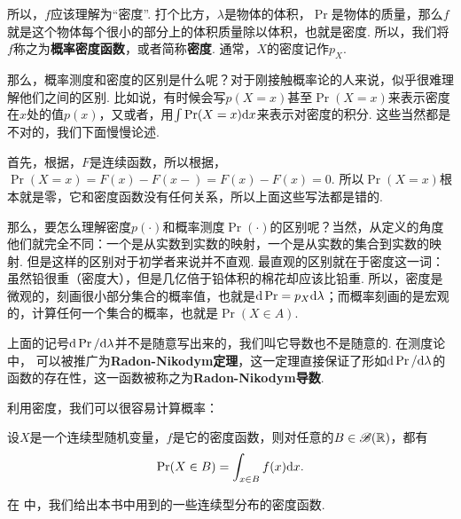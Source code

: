 所以，$f$应该理解为“密度”. 打个比方，$\lambda$是物体的体积，$\Pr$是物体的质量，那么$f$就是这个物体每个很小的部分上的体积质量除以体积，也就是密度. 所以，我们将$f$称之为\textbf{概率密度函数}，或者简称\textbf{密度}. 通常，$X$的密度记作$p_X$. 

那么，概率测度和密度的区别是什么呢？对于刚接触概率论的人来说，似乎很难理解他们之间的区别. 比如说，有时候会写$p(X=x)$甚至$\Pr(X=x)$来表示密度在$x$处的值$p(x)$，又或者，用$\int\Pr(X=x)\mathrm{d} x$来表示对密度的积分. 这些当然都是不对的，我们下面慢慢论述. 

首先，根据，$F$是连续函数，所以根据，$\Pr(X=x)=F(x)-F(x-)=F(x)-F(x)=0$. 所以$\Pr(X=x)$根本就是零，它和密度函数没有任何关系，所以上面这些写法都是错的. 

那么，要怎么理解密度$p(\cdot)$和概率测度$\Pr(\cdot)$的区别呢？当然，从定义的角度他们就完全不同：一个是从实数到实数的映射，一个是从实数的集合到实数的映射. 但是这样的区别对于初学者来说并不直观. 最直观的区别就在于密度这一词：虽然铅很重（密度大），但是几亿倍于铅体积的棉花却应该比铅重. 所以，密度是微观的，刻画很小部分集合的概率值，也就是$\mathrm{d}\Pr=p_X\mathrm{d} \lambda$；而概率刻画的是宏观的，计算任何一个集合的概率，也就是$\Pr(X\in A)$.

\begin{remark}
    上面的记号$\mathrm{d}\Pr/\mathrm{d}\lambda$并不是随意写出来的，我们叫它导数也不是随意的. 在测度论中， 可以被推广为\textbf{Radon-Nikodym定理}，这一定理直接保证了形如$\mathrm{d}\Pr/\mathrm{d}\lambda$的函数的存在性，这一函数被称之为\textbf{Radon-Nikodym导数}. 
\end{remark}

利用密度，我们可以很容易计算概率：
\begin{theorem}\label{thm:continuous-prob}
设$X$是一个连续型随机变量，$f$是它的密度函数，则对任意的$B\in\mathscr{B}(\mathbb{R})$，都有
\[\Pr(X\in B)=\int_{x\in B}f(x)\mathrm{d} x.\]
\end{theorem}

在 中，我们给出本书中用到的一些连续型分布的密度函数. 

